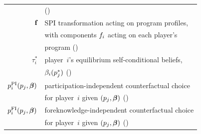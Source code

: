 \documentclass[sigconf]{aamas}
\newcommand{\eqscbi}{\tau_i^*}
\newcommand{\fullbf}{\boldsymbol{\beta}}
\theoremstyle{definition}
\begin{document}
\begin{table}[!htbp]
\begin{tabular}{rl}
        & (\pageref{sub:outcomes}) \\
        $\textbf{f}$ & SPI transformation acting on program profiles, \\
        & with components $f_i$ acting on each player's \\
        & program (\pageref{sub:outcomes}) \\
        $\eqscbi$ & player~$i$'s equilibrium self-conditional beliefs, \\
        & $\beta_i(p_j^*)$ (\pageref{sub:outcomes}) \\
        $\progi^{\text{PI}}(\progj, \fullbf)$ & participation-independent counterfactual choice \\
        & for player~$i$ given $(\progj, \fullbf)$ (\pageref{sub:pifi}) \\
        $\progi^{\text{FI}}(\progj, \fullbf)$ & foreknowledge-independent counterfactual choice \\
        & for player~$i$ given $(\progj, \fullbf)$ (\pageref{sub:pifi}) \\
        \bottomrule
    \end{tabular}
\end{table}


\end{document}
